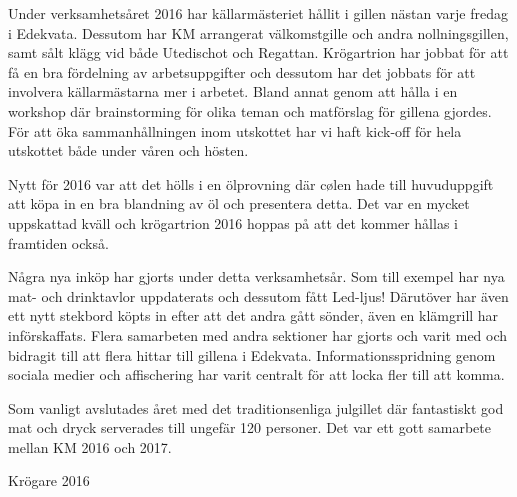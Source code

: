 \documentclass[../_main/handlingar.tex]{subfiles}
\begin{document}
Under verksamhetsåret 2016 har källarmästeriet hållit i gillen nästan varje fredag i Edekvata. Dessutom har KM arrangerat välkomstgille och andra nollningsgillen, samt sålt klägg vid både Utedischot och Regattan.
Krögartrion har jobbat för att få en bra fördelning av arbetsuppgifter och dessutom har det jobbats för att involvera källarmästarna mer i arbetet. Bland annat genom att hålla i en workshop där brainstorming för olika teman och matförslag för gillena gjordes. För att öka sammanhållningen inom utskottet har vi haft kick-off för hela utskottet både under våren och hösten.

Nytt för 2016 var att det hölls i en ölprovning där cølen hade till huvuduppgift att köpa in en bra blandning av öl och presentera detta. Det var en mycket uppskattad kväll och krögartrion 2016 hoppas på att det kommer hållas i framtiden också.

Några nya inköp har gjorts under detta verksamhetsår. Som till exempel har nya mat- och drinktavlor uppdaterats och dessutom fått Led-ljus! Därutöver har även ett nytt stekbord köpts in efter att det andra gått sönder, även en klämgrill har införskaffats.
Flera samarbeten med andra sektioner har gjorts och varit med och bidragit till att flera hittar till gillena i Edekvata. Informationsspridning genom sociala medier och affischering har varit centralt för att locka fler till att komma.

Som vanligt avslutades året med det traditionsenliga julgillet där fantastiskt god mat och dryck serverades till ungefär 120 personer.  Det var ett gott samarbete mellan KM 2016 och 2017.
\begin{signatures}{1}
    \mvh
    \signature{Malin Lindström}{Krögare 2016}
\end{signatures}
\end{document}
